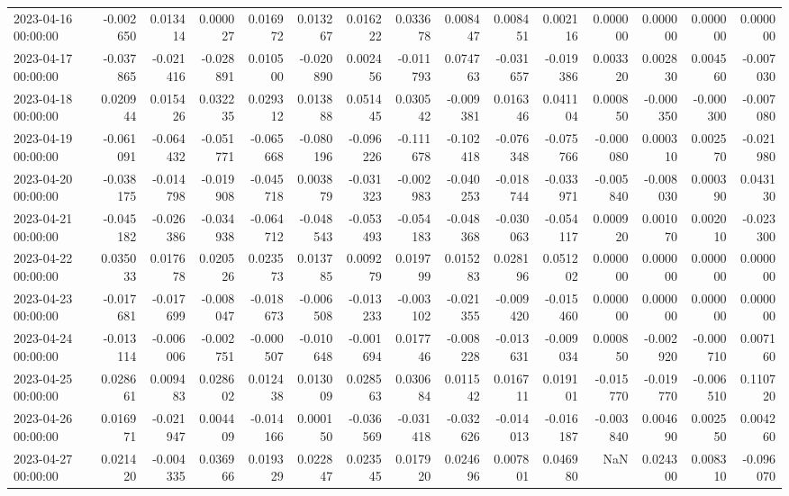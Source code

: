 \begin{tabular}{lrrrrrrrrrrrrrr}
2023-04-16 00:00:00 & -0.002650 & 0.013414 & 0.000027 & 0.016972 & 0.013267 & 0.016222 & 0.033678 & 0.008447 & 0.008451 & 0.002116 & 0.000000 & 0.000000 & 0.000000 & 0.000000 \\
2023-04-17 00:00:00 & -0.037865 & -0.021416 & -0.028891 & 0.010500 & -0.020890 & 0.002456 & -0.011793 & 0.074763 & -0.031657 & -0.019386 & 0.003320 & 0.002830 & 0.004560 & -0.007030 \\
2023-04-18 00:00:00 & 0.020944 & 0.015426 & 0.032235 & 0.029312 & 0.013888 & 0.051445 & 0.030542 & -0.009381 & 0.016346 & 0.041104 & 0.000850 & -0.000350 & -0.000300 & -0.007080 \\
2023-04-19 00:00:00 & -0.061091 & -0.064432 & -0.051771 & -0.065668 & -0.080196 & -0.096226 & -0.111678 & -0.102418 & -0.076348 & -0.075766 & -0.000080 & 0.000310 & 0.002570 & -0.021980 \\
2023-04-20 00:00:00 & -0.038175 & -0.014798 & -0.019908 & -0.045718 & 0.003879 & -0.031323 & -0.002983 & -0.040253 & -0.018744 & -0.033971 & -0.005840 & -0.008030 & 0.000390 & 0.043130 \\
2023-04-21 00:00:00 & -0.045182 & -0.026386 & -0.034938 & -0.064712 & -0.048543 & -0.053493 & -0.054183 & -0.048368 & -0.030063 & -0.054117 & 0.000920 & 0.001070 & 0.002010 & -0.023300 \\
2023-04-22 00:00:00 & 0.035033 & 0.017678 & 0.020526 & 0.023573 & 0.013785 & 0.009279 & 0.019799 & 0.015283 & 0.028196 & 0.051202 & 0.000000 & 0.000000 & 0.000000 & 0.000000 \\
2023-04-23 00:00:00 & -0.017681 & -0.017699 & -0.008047 & -0.018673 & -0.006508 & -0.013233 & -0.003102 & -0.021355 & -0.009420 & -0.015460 & 0.000000 & 0.000000 & 0.000000 & 0.000000 \\
2023-04-24 00:00:00 & -0.013114 & -0.006006 & -0.002751 & -0.000507 & -0.010648 & -0.001694 & 0.017746 & -0.008228 & -0.013631 & -0.009034 & 0.000850 & -0.002920 & -0.000710 & 0.007160 \\
2023-04-25 00:00:00 & 0.028661 & 0.009483 & 0.028602 & 0.012438 & 0.013009 & 0.028563 & 0.030684 & 0.011542 & 0.016711 & 0.019101 & -0.015770 & -0.019770 & -0.006510 & 0.110720 \\
2023-04-26 00:00:00 & 0.016971 & -0.021947 & 0.004409 & -0.014166 & 0.000150 & -0.036569 & -0.031418 & -0.032626 & -0.014013 & -0.016187 & -0.003840 & 0.004690 & 0.002550 & 0.004260 \\
2023-04-27 00:00:00 & 0.021420 & -0.004335 & 0.036966 & 0.019329 & 0.022847 & 0.023545 & 0.017920 & 0.024696 & 0.007801 & 0.046980 & NaN & 0.024300 & 0.008310 & -0.096070 \\

\end{tabular}
